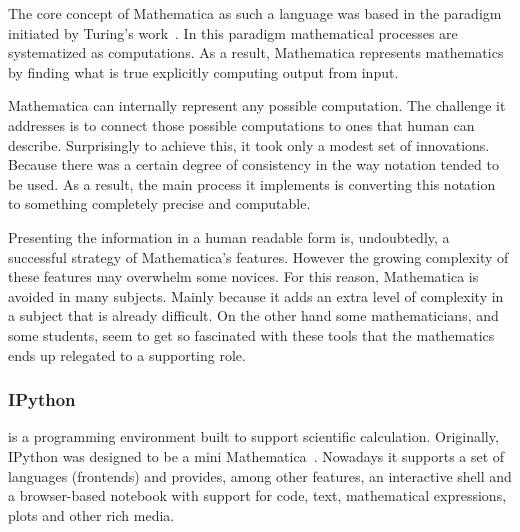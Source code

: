 The core concept of Mathematica as such a language was based in the paradigm initiated by Turing's work~\cite{wolfram2003wolfram}. In this paradigm mathematical processes are systematized as computations. As a result, Mathematica represents mathematics by finding what is true explicitly computing output from input. 

Mathematica can internally represent any possible computation. The challenge it addresses is to connect those possible computations to ones that human can describe. Surprisingly to achieve this, it took only a modest set of innovations. Because there was a certain degree of consistency in the way notation tended to be used. As a result, the main process it implements is converting this notation to something completely precise and computable. 

Presenting the information in a human readable form is, undoubtedly, a successful strategy of Mathematica's features. However the growing complexity of these features may overwhelm some novices. For this reason, Mathematica is avoided in many subjects. Mainly because it adds an extra level of complexity in a subject that is already difficult. On the other hand some mathematicians, and some students, seem to get so fascinated with these tools that the mathematics ends up relegated to a supporting role.
\subsubsection{IPython~\cite{PER-GRA:2007}} is a programming environment built to support scientific calculation. Originally, IPython was designed to be a mini Mathematica~\cite{wolfram1991mathematica}. Nowadays it supports a set of languages (frontends) and provides, among other features, an interactive shell and a browser-based notebook with support for code, text, mathematical expressions, plots and other rich media. 

